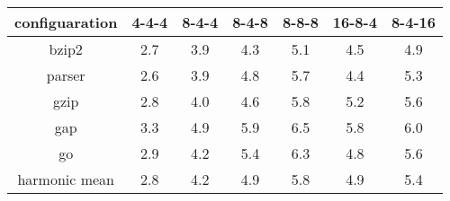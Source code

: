 \begin{tabular}{|c|c|c|c|c|c|c|}
\hline 
configuaration&
4-4-4&
8-4-4&
8-4-8&
8-8-8&
16-8-4&
8-4-16\\
\hline
\hline 
bzip2&
2.7&
3.9&
4.3&
5.1&
4.5&
4.9\\
\hline 
parser&
2.6&
3.9&
4.8&
5.7&
4.4&
5.3\\
\hline 
gzip&
2.8&
4.0&
4.6&
5.8&
5.2&
5.6\\
\hline 
gap&
3.3&
4.9&
5.9&
6.5&
5.8&
6.0\\
\hline 
go&
2.9&
4.2&
5.4&
6.3&
4.8&
5.6\\
\hline 
harmonic mean&
2.8&
4.2&
4.9&
5.8&
4.9&
5.4\\
\hline
\end{tabular}
